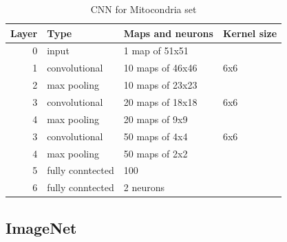 \documentclass{article} %
\begin{document}
\begin{table}
\centering
\begin{tabular}{@{}rlll@{}}\toprule
Layer & Type & Maps and neurons& Kernel size \\ \midrule
0 & input & 1 map of 51x51 &\\
1& convolutional & 10 maps of 46x46 & 6x6\\
2 & max pooling & 10 maps of 23x23 &  \\
3 & convolutional & 20 maps of 18x18& 6x6 \\
4 & max pooling & 20 maps of 9x9& \\ 
3 & convolutional & 50 maps of 4x4& 6x6 \\
4 & max pooling & 50 maps of 2x2& \\ 
5 & fully conntected& 100 & \\
6 & fully conntected & 2 neurons & \\ \bottomrule
\end{tabular}
\caption{CNN for Mitocondria set}
\label{fig:CNN3}
\end{table}

\subsection{ImageNet}
\end{document}
